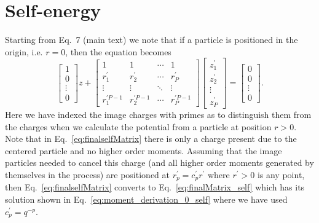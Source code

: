 \documentclass[
journal=jctcce,
manuscript=letter]{achemso}
\begin{document}
\section{Self-energy}\label{app:D}
Starting from Eq.~7 (main text) we note that if a particle is positioned in the origin, i.e. $r=0$, then the equation becomes
\begin{equation}
\label{eq:finalselfMatrix}
\begin{bmatrix}
       1    \\[0.3em]
       0  \\[0.3em]
       \vdots          \\[0.3em]
       0      
     \end{bmatrix}z + \begin{bmatrix}  
  1 & 1 & \cdots & 1 \\
  r^{\prime}_1 & r^{\prime}_2 & \cdots & r^{\prime}_P \\
  \vdots  & \vdots  & \ddots & \vdots  \\
  r^{\prime P-1}_1 & r^{\prime P-1}_2 & \cdots & r^{\prime P-1}_P
     \end{bmatrix}
     \begin{bmatrix}
       z_{1}^{\prime}    \\[0.3em]
       z_{2}^{\prime}  \\[0.3em]
       \vdots          \\[0.3em]
       z_{P}^{\prime} 
     \end{bmatrix}
     = \begin{bmatrix}
       0    \\[0.3em]
       0  \\[0.3em]
       \vdots          \\[0.3em]
       0      
     \end{bmatrix}.
\end{equation}
Here we have indexed the image charges with primes as to distinguish them from the charges when we calculate the potential from a particle at position $r>0$. Note that in Eq.~\ref{eq:finalselfMatrix} there is only a charge present due to the centered particle and no higher order moments. Assuming that the image particles needed to cancel this charge (and all higher order moments generated by themselves in the process) are positioned at $r^{\prime}_p=c^{\prime}_pr^{\prime}$ where $r^{\prime}>0$ is any point, then Eq.~\ref{eq:finalselfMatrix} converts to Eq.~\ref{eq:finalMatrix_self} which has its solution\cite{el2003explicit} shown in Eq.~\ref{eq:moment_derivation_0_self} where we have used $c^{\prime}_p=q^{-p}$.
\end{document}
